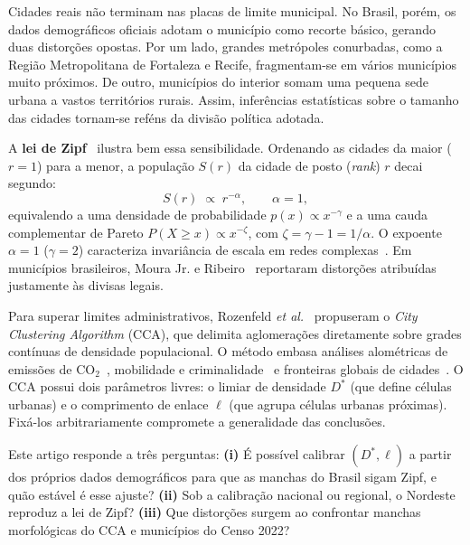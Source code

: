 \documentclass[10pt,a4paper,twocolumn]{article}
\begin{document}
Cidades reais não terminam nas placas de limite municipal. No Brasil, porém, os dados demográficos oficiais adotam o município como recorte básico, gerando duas distorções opostas. Por um lado, grandes metrópoles conurbadas, como a Região Metropolitana de Fortaleza e Recife, fragmentam-se em vários municípios muito próximos. De outro, municípios do interior somam uma pequena sede urbana a vastos territórios rurais. Assim, inferências estatísticas sobre o tamanho das cidades tornam-se reféns da divisão política adotada.

A \textbf{lei de Zipf}~\cite{zipf1949} ilustra bem essa sensibilidade. Ordenando as cidades da maior ($r=1$) para a menor, a população $S(r)$ da cidade de posto (\emph{rank}) $r$ decai segundo:
%
\begin{equation}
S(r) \;\propto\; r^{-\alpha}, \qquad \alpha = 1,
\label{eq:zipf}
\end{equation}
%
equivalendo a uma densidade de probabilidade $p(x)\propto x^{-\gamma}$ e a uma cauda complementar de Pareto $P(X\geq x)\propto x^{-\zeta}$, com $\zeta=\gamma-1=1/\alpha$. O expoente $\alpha=1$ ($\gamma=2$) caracteriza invariância de escala em redes complexas~\cite{newman2005}. Em municípios brasileiros, Moura Jr. e Ribeiro~\cite{moura2006} reportaram distorções atribuídas justamente às divisas legais.

Para superar limites administrativos, Rozenfeld \emph{et al.}~\cite{rozenfeld2008,rozenfeld2011} propuseram o \emph{City Clustering Algorithm} (CCA), que delimita aglomerações diretamente sobre grades contínuas de densidade populacional. O método embasa análises alométricas de emissões de CO$_2$~\cite{oliveira2014}, mobilidade e criminalidade~\cite{caminha2017} e fronteiras globais de cidades~\cite{oliveira2018}. O CCA possui dois parâmetros livres: o limiar de densidade $D^{*}$ (que define células urbanas) e o comprimento de enlace $\ell$ (que agrupa células urbanas próximas). Fixá-los arbitrariamente compromete a generalidade das conclusões.

Este artigo responde a três perguntas: \textbf{(i)} É possível calibrar $(D^{*},\ell)$ a partir dos próprios dados demográficos para que as manchas do Brasil sigam Zipf, e quão estável é esse ajuste? \textbf{(ii)} Sob a calibração nacional ou regional, o Nordeste reproduz a lei de Zipf? \textbf{(iii)} Que distorções surgem ao confrontar manchas morfológicas do CCA e municípios do Censo 2022?
\end{document}
